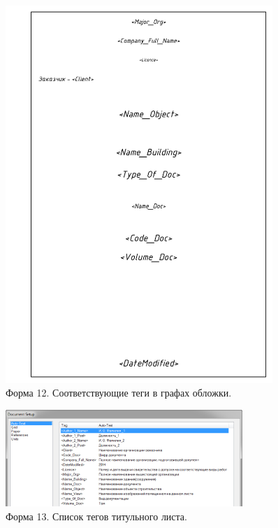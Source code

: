 \documentclass[14pt]{extreport}
\begin{document}
\begin{figure}[h]
	\centering
	\includegraphics[width=0.9\textwidth]{SPDS_OBLOZHKA_with_tagname}
	\caption{Форма 12. Соответствующие теги в графах обложки.\label{SPDS_OBLOZHKA_with_tagname}}
\end{figure}

\begin{figure}[h]
	\centering
	\includegraphics[width=0.8\textwidth]{SPDS_TIT_LIST}
    \caption{Форма 13. Список тегов титульного листа.\label{SPDS_TIT_LIST}}
\end{figure}
\end{document}
